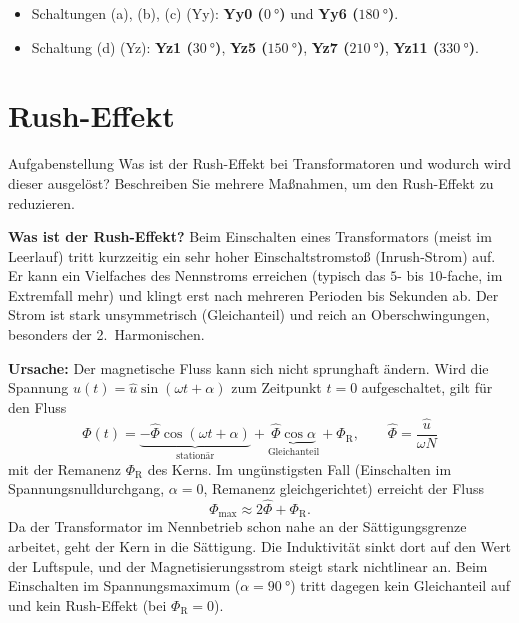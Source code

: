 \documentclass[a4paper,11pt]{scrreprt}
\begin{document}
\begin{ergebnis}
\begin{itemize}[nosep]
  \item Schaltungen (a), (b), (c) (Yy): \textbf{Yy0 ($\SI{0}{\degree}$)} und \textbf{Yy6 ($\SI{180}{\degree}$)}.
  \item Schaltung (d) (Yz): \textbf{Yz1 ($\SI{30}{\degree}$)}, \textbf{Yz5 ($\SI{150}{\degree}$)}, \textbf{Yz7 ($\SI{210}{\degree}$)}, \textbf{Yz11 ($\SI{330}{\degree}$)}.
\end{itemize}
\end{ergebnis}

\section{Rush-Effekt}\label{sec:a4}

\begin{aufgabe}{Aufgabenstellung}
Was ist der Rush-Effekt bei Transformatoren und wodurch wird dieser ausgelöst? Beschreiben Sie mehrere Maßnahmen, um den Rush-Effekt zu reduzieren.
\end{aufgabe}

\textbf{Was ist der Rush-Effekt?} Beim Einschalten eines Transformators (meist im Leerlauf) tritt kurzzeitig ein sehr hoher Einschaltstromstoß (Inrush-Strom) auf. Er kann ein Vielfaches des Nennstroms erreichen (typisch das $5$- bis $10$-fache, im Extremfall mehr) und klingt erst nach mehreren Perioden bis Sekunden ab. Der Strom ist stark unsymmetrisch (Gleichanteil) und reich an Oberschwingungen, besonders der 2.~Harmonischen.

\textbf{Ursache:} Der magnetische Fluss kann sich nicht sprunghaft ändern. Wird die Spannung $u(t)=\hat{u}\sin(\omega t+\alpha)$ zum Zeitpunkt $t=0$ aufgeschaltet, gilt für den Fluss
\begin{equation*}
  \Phi(t) = \underbrace{-\hat{\Phi}\cos(\omega t+\alpha)}_{\text{stationär}}
            + \underbrace{\hat{\Phi}\cos\alpha}_{\text{Gleichanteil}}
            + \Phi_\mathrm{R},
  \qquad \hat{\Phi}=\frac{\hat{u}}{\omega N}
\end{equation*}
mit der Remanenz $\Phi_\mathrm{R}$ des Kerns. Im ungünstigsten Fall (Einschalten im Spannungsnulldurchgang, $\alpha=0$, Remanenz gleichgerichtet) erreicht der Fluss
\begin{equation*}
  \Phi_{\max} \approx 2\hat{\Phi} + \Phi_\mathrm{R}.
\end{equation*}
Da der Transformator im Nennbetrieb schon nahe an der Sättigungsgrenze arbeitet, geht der Kern in die Sättigung. Die Induktivität sinkt dort auf den Wert der Luftspule, und der Magnetisierungsstrom steigt stark nichtlinear an. Beim Einschalten im Spannungsmaximum ($\alpha=\SI{90}{\degree}$) tritt dagegen kein Gleichanteil auf und kein Rush-Effekt (bei $\Phi_\mathrm{R}=0$).
\end{document}
